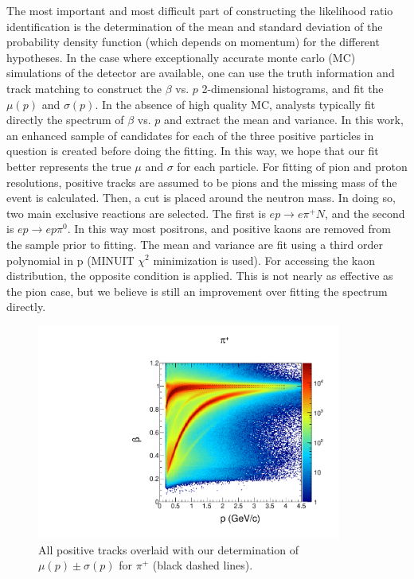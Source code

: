 The most important and most difficult part of constructing the likelihood ratio identification is the determination of the mean and standard deviation of the probability density function (which depends on momentum) for the different hypotheses.  In the case where exceptionally accurate monte carlo (MC) simulations of the detector are available, one can use the truth information and track matching to construct the $\beta$ vs. $p$ 2-dimensional histograms, and fit the $\mu(p)$ and $\sigma(p)$.  In the absence of high quality MC, analysts typically fit directly the spectrum of $\beta$ vs. $p$ and extract the mean and variance.  In this work, an enhanced sample of candidates for each of the three positive particles in question is created before doing the fitting.  In this way, we hope that our fit better represents the true $\mu$ and $\sigma$ for each particle.  For fitting of pion and proton resolutions, positive tracks are assumed to be pions and the missing mass of the event is calculated.  Then, a cut is placed around the neutron mass.  In doing so, two main exclusive reactions are selected.  The first is $ep \rightarrow e\pi^+N$, and the second is $ep \rightarrow ep\pi^0$.  In this way most positrons, and positive kaons are removed from the sample prior to fitting.  The mean and variance are fit using a third order polynomial in p (MINUIT $\chi^2$ minimization is used).  For accessing the kaon distribution, the opposite condition is applied.  This is not nearly as effective as the pion case, but we believe is still an improvement over fitting the spectrum directly.    

\begin{figure}
  \begin{center}
    \includegraphics[width=10cm]{image/plots/hadron-id/beautiful_pbeta_pip.pdf}
    \caption{All positive tracks overlaid with our determination of $\mu(p) \pm \sigma(p)$ for $\pi^+$ (black dashed lines).}
  \end{center}
\end{figure}

